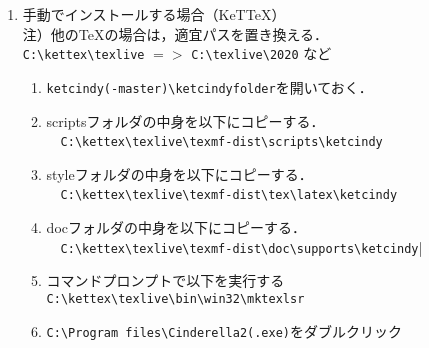 \documentclass{ujarticle}
\begin{document}
\begin{enumerate}[\bf\large 1.]
\item 手動でインストールする場合（KeTTeX）\\
\hspace*{1zw}注）他のTeXの場合は，適宜パスを置き換える．\\
\hspace*{3zw}\verb|C:\kettex\texlive| $=>$ \verb|C:\texlive\2020| など
  \begin{enumerate}[(1)]
  \item \verb|ketcindy(-master)\ketcindyfolder|を開いておく．
  \item scriptsフォルダの中身を以下にコピーする．\\
　\verb|C:\kettex\texlive\texmf-dist\scripts\ketcindy|
  \item styleフォルダの中身を以下にコピーする．\\
　\verb|C:\kettex\texlive\texmf-dist\tex\latex\ketcindy|
  \item docフォルダの中身を以下にコピーする．\\
　\verb|C:\kettex\texlive\texmf-dist\doc\supports\ketcindy||
  \item コマンドプロンプトで以下を実行する\\
  \hspace*{1zw}\verb|C:\kettex\texlive\bin\win32\mktexlsr|
  \item \verb|C:\Program files\Cinderella2(.exe)|をダブルクリック
  \end{enumerate}
\end{enumerate}
\end{document}
